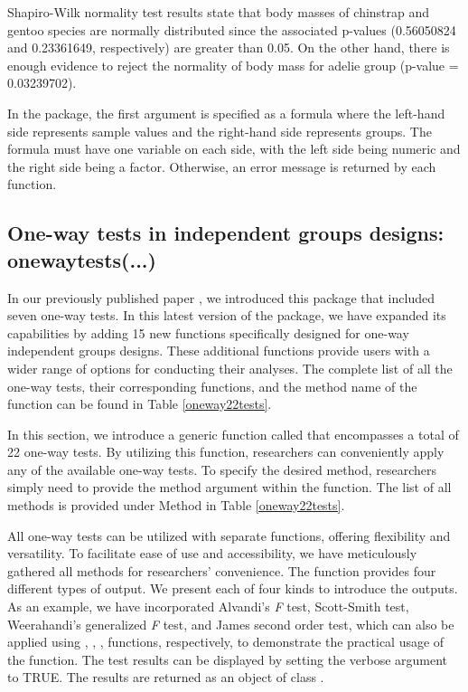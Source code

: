 Shapiro-Wilk normality test results state that body masses of chinstrap and gentoo species are normally distributed since the associated p-values (0.56050824 and 0.23361649, respectively) are greater than 0.05. On the other hand, there is enough evidence to reject the normality of body mass for adelie group (p-value = 0.03239702).

In the  package, the first argument is specified as a formula where the left-hand side represents sample values and the right-hand side represents groups. The formula must have one variable on each side, with the left side being numeric and the right side being a factor. Otherwise, an error message is returned by each function.


\subsection{One-way tests in independent groups designs: onewaytests(...)}\label{onewaytests_imp}

In our previously published paper \citep{dag2018onewaytests}, we introduced this package that included seven one-way tests. In this latest version of the package, we have expanded its capabilities by adding 15 new functions specifically designed for one-way independent groups designs. These additional functions provide users with a wider range of options for conducting their analyses. The complete list of all the one-way tests, their corresponding functions, and the method name of the  function can be found in Table \ref{oneway22tests}.

In this section, we introduce a generic function called  that encompasses a total of 22 one-way tests. By utilizing this function, researchers can conveniently apply any of the available one-way tests. To specify the desired method, researchers simply need to provide the method argument within the  function. The list of all methods is provided under Method in Table \ref{oneway22tests}.

All one-way tests can be utilized with separate functions, offering flexibility and versatility. To facilitate ease of use and accessibility, we have meticulously gathered all methods for researchers’ convenience. The  function provides four different types of output. We present each of four kinds to introduce the outputs. As an example, we have incorporated Alvandi's \textit{F} test, Scott-Smith test,  Weerahandi's generalized \textit{F} test, and James second order test, which can also be applied using , , ,  functions, respectively, to demonstrate the practical usage of the  function. The test results can be displayed by setting the verbose argument to TRUE. The results are returned as an object of class . 

